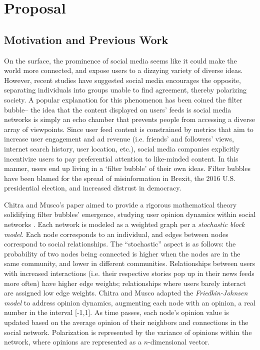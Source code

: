 \section*{Proposal}

\subsection*{Motivation and Previous Work}

On the surface, the prominence of social media seems like it could make 
the world more connected, and expose users to a dizzying variety of diverse
ideas. However, recent studies have suggested social media encourages the
opposite, separating individuals into groups unable to find agreement, thereby
polarizing society. A popular explanation for this phenomenon has been coined 
the filter bubble-- the idea that the content displayed on 
users’ feeds is social
media networks is simply an echo chamber that prevents people from accessing a
diverse array of viewpoints. Since user feed content is constrained by metrics
that aim to increase user engagement and ad revenue (i.e. friends’ and 
followers’
views, internet search history, user location, etc.), social media companies
explicitly incentivize users to pay preferential attention to like-minded
content. In this manner, users end up living in a ‘filter bubble’ of their own
ideas. Filter bubbles have been blamed for the spread of misinformation in
Brexit, the 2016 U.S. presidential election, and increased 
distrust in democracy.

Chitra and Musco’s paper aimed to provide a rigorous mathematical theory
solidifying filter bubbles’ emergence, studying user opinion dynamics within
social networks \cite{chitra_analyzing_2020}.
Each network is modeled as a weighted graph per a \emph{stochastic
block model}. Each node corresponds to an individual, and edges between nodes
correspond to social relationships. The “stochastic” aspect is as follows: the 
probability of two nodes being connected is higher 
when the nodes are in the same
community, and lower in different communities. Relationships between users with
increased interactions (i.e. their respective stories pop up in their news feeds
more often) have higher edge weights; relationships where users barely interact
are assigned low edge weights. Chitra and Musco 
adapted the \emph{Friedkin-Johnsen model}
to address opinion dynamics,  augmenting each 
node with an opinion, a real number
in the interval [-1,1]. As time passes, each node’s opinion value is updated
based on the average opinion of their neighbors and connections in the social
network. Polarization is represented by the variance of opinions within the
network, where opinions are represented as a $n$-dimensional vector.

